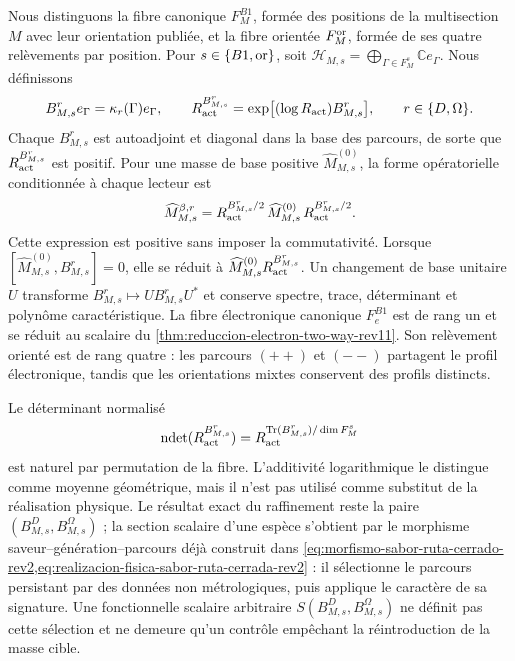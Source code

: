 Nous distinguons la fibre canonique \(F_M^{B1}\), formée des positions de
la multisection \(M\) avec leur orientation publiée, et la fibre orientée
\(F_M^{\rm or}\), formée de ses quatre relèvements par position. Pour
\(s\in\{B1,{\rm or}\}\), soit
\(\mathcal H_{M,s}=\bigoplus_{\Gamma\in F_M^s}\mathbb C e_\Gamma\). Nous définissons
\begin{equation}
 B_{M,s}^r e_\Gamma=\kappa_r(\Gamma)e_\Gamma,
 \qquad
 R_{\rm act}^{B_{M,s}^r}
 =\exp\bigl[(\log R_{\rm act})B_{M,s}^r\bigr],
 \qquad r\in\{D,\Omega\}.
 \label{eq:operadores-fibra-two-way-rev11}
\end{equation}
Chaque \(B_{M,s}^r\) est autoadjoint et diagonal dans la base des parcours, de sorte que
\(R_{\rm act}^{B_{M,s}^r}\) est positif. Pour une masse de base positive
\(\widehat M_{M,s}^{(0)}\), la forme opératorielle conditionnée à chaque lecteur est
\begin{equation}
 \widehat M_{M,s}^{\beta,r}
 =R_{\rm act}^{B_{M,s}^r/2}\,
  \widehat M_{M,s}^{(0)}\,
  R_{\rm act}^{B_{M,s}^r/2}.
 \label{eq:ley-operatoria-fibra-rev11}
\end{equation}
Cette expression est positive sans imposer la commutativité. Lorsque
\([\widehat M_{M,s}^{(0)},B_{M,s}^r]=0\), elle se réduit à
\(\widehat M_{M,s}^{(0)}R_{\rm act}^{B_{M,s}^r}\).
Un changement de base unitaire \(U\) transforme
\(B_{M,s}^r\mapsto UB_{M,s}^rU^*\) et conserve spectre, trace, déterminant et
polynôme caractéristique. La fibre électronique canonique \(F_e^{B1}\) est de
rang un et se réduit au scalaire du
\cref{thm:reduccion-electron-two-way-rev11}.
Son relèvement orienté est de rang quatre : les parcours \((++)\) et \((--)\)
partagent le profil électronique, tandis que les orientations mixtes conservent
des profils distincts.

Le déterminant normalisé
\[
 \operatorname{ndet}(R_{\rm act}^{B_{M,s}^r})
 =R_{\rm act}^{\operatorname{Tr}(B_{M,s}^r)/\dim F_M^s}
\]
est naturel par permutation de la fibre. L'additivité logarithmique le distingue
comme moyenne géométrique, mais il n'est pas utilisé comme substitut de la réalisation physique.
Le résultat exact du raffinement reste la paire
\((B_{M,s}^D,B_{M,s}^\Omega)\) ; la section scalaire d'une espèce s'obtient
par le morphisme saveur--génération--parcours déjà construit dans
\cref{eq:morfismo-sabor-ruta-cerrado-rev2,eq:realizacion-fisica-sabor-ruta-cerrada-rev2} :
il sélectionne le parcours persistant par des données non métrologiques, puis applique le
caractère de sa signature. Une fonctionnelle scalaire arbitraire
\(S(B_{M,s}^D,B_{M,s}^\Omega)\) ne définit pas cette sélection et ne demeure qu'un
contrôle empêchant la réintroduction de la masse cible.

